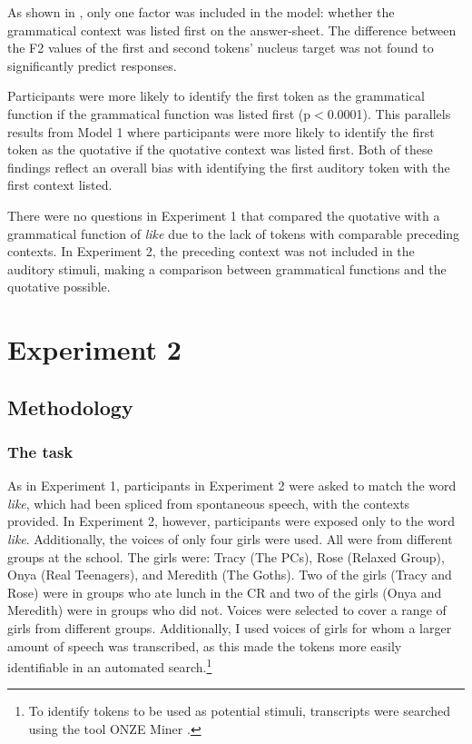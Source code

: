 As shown in , only one factor was included in the model: whether the grammatical context was listed first on the answer-sheet. The difference between the F2 values of the first and second tokens' nucleus target was not found to significantly predict responses.

Participants were more likely to identify the first token as the grammatical function if the grammatical function was listed first (p$<$0.0001). This parallels results from Model 1 where participants were more likely to identify the first token as the quotative if the quotative context was listed first. Both of these findings reflect an overall bias with identifying the first auditory token with the first context listed. 


There were no questions in Experiment 1 that compared the quotative with a grammatical function of \textit{like} due to the lack of tokens with comparable preceding contexts. In Experiment 2, the preceding context was not included in the auditory stimuli, making a comparison between grammatical functions and the quotative possible.




\section{Experiment 2} 

\subsection{Methodology}

\subsubsection{The task} 

As in Experiment 1, participants in Experiment 2 were asked to match the word \textit{like}, which had been spliced from spontaneous speech, with the contexts provided. In Experiment 2, however, participants were exposed only to the word \textit{like}. Additionally, the voices of only four girls were used. All were from different groups at the school. The girls were: Tracy (The PCs), Rose (Relaxed Group), Onya (Real Teenagers), and Meredith (The Goths). Two of the girls (Tracy and Rose) were in groups who ate lunch in the CR and two of the girls (Onya and Meredith) were in groups who did not. Voices were selected to cover a range of girls from different groups. Additionally, I used voices of girls for whom a larger amount of speech was transcribed, as this made the tokens more easily identifiable in an automated search.\footnote{To identify tokens to be used as potential stimuli, transcripts were searched using the tool ONZE Miner \citep{onzeminer}.} 

